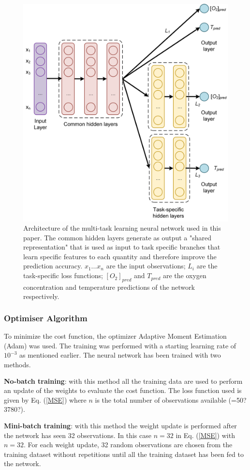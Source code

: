 \documentclass[9pt,twocolumn,twoside,pdftex]{optica}
\begin{document}
\begin{figure}[htbp]
\centering
\includegraphics[width=8.7 cm]{NN_MTL_O2_T.png}
\caption{Architecture of the multi-task learning neural network used in this paper. The common hidden layers generate as output a "shared representation" that is used as input to task specific branches that learn specific features to each quantity and therefore improve the prediction accuracy. $x_1 ... x_n$ are the input observations; $L_i$ are the task-specific loss functions; $[O_2]_{pred}$ and $T_{pred}$ are the oxygen concentration and temperature predictions of the network respectively.} 
\label{fig:NN_MTL_O2_T}
\end{figure}


\subsubsection{Optimiser Algorithm}

To minimize the cost function, the optimizer Adaptive Moment Estimation (Adam) \cite{Kingma2014, Michelucci2017} was used. The training was performed with a starting learning rate of $10^{-3}$ as mentioned earlier. The neural network has been trained with two methods. 

{\bf No-batch training}:
with this method all the training data  are used to perform an update of the weights to evaluate the cost function. The loss function used is given by Eq. (\ref{MSE}) where $n$ is the total number of observations available (=50? 3780?).

{\bf Mini-batch training}:
with this method the weight update is performed after the network has seen 32 observations. In this case $n=32$ in Eq. (\ref{MSE}) with $n=32$. For each weight update, 32 random observations are chosen from the training dataset without repetitions until all the training dataset has been fed to the network.  
\end{document}
